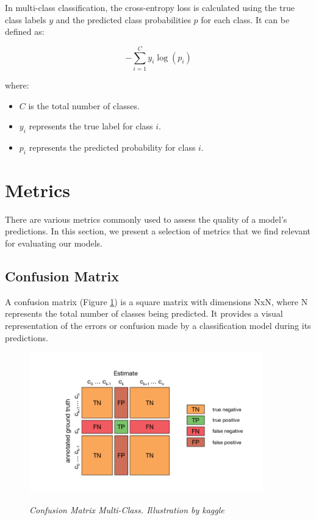 In multi-class classification, the cross-entropy loss is calculated using the
true class labels \(y\) and the predicted class probabilities \(p\) for each
class. It can be defined as:

\[-\sum_{i=1}^{C} y_i \log(p_i)\]

\noindent where:

\begin{itemize}
  \item \(C\) is the total number of classes.
  \item \(y_i\) represents the true label for class \(i\).
  \item \(p_i\) represents the predicted probability for class \(i\).
\end{itemize}

\section{Metrics}
{\label{sec:metrics}}

There are various metrics commonly used to assess the quality of a model's predictions.
In this section, we present a selection of metrics that we find relevant for evaluating our models.

\subsection{Confusion Matrix}

A confusion matrix (Figure \ref{fig:confusion-matrix}) is a square matrix with dimensions  NxN,
where  N represents the total number of classes being predicted.
It provides a visual representation of the errors or confusion made by a classification
model during its predictions. \\


\begin{figure}[H]
  \begin{adjustbox}{trim={0pt 0.5cm 0pt 1cm}, clip}
    \centering
    \includegraphics[width=0.9\textwidth]{imatges/preliminaries/confusion-matrix.png}
  \end{adjustbox}
  \caption[Confusion Matrix Multi-Class]{\textit{Confusion Matrix Multi-Class. Illustration by kaggle}}
  {\label{fig:confusion-matrix}}
\end{figure}

